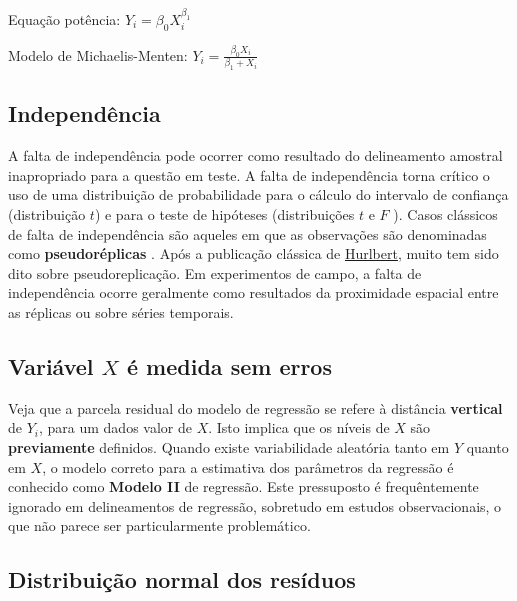 \documentclass[
]{book}
\begin{document}
Equação potência: \(Y_i = \beta_0 X_i^{\beta_1}\)

Modelo de Michaelis-Menten: \(Y_i = \frac{\beta_0 X_i}{\beta_1 + X_i}\)

\hypertarget{independuxeancia}{%
\subsection{Independência}\label{independuxeancia}}

A falta de independência pode ocorrer como resultado do delineamento amostral inapropriado para a questão em teste. A falta de independência torna crítico o uso de uma distribuição de probabilidade para o cálculo do intervalo de confiança (distribuição \(t\)) e para o teste de hipóteses (distribuições \(t\) e \(F\) ). Casos clássicos de falta de independência são aqueles em que as observações são denominadas como \textbf{pseudoréplicas} \citep{hurlbert1984pseudoreplication}. Após a publicação clássica de \href{https://esajournals.onlinelibrary.wiley.com/doi/abs/10.2307/1942661}{Hurlbert}, muito tem sido dito sobre pseudoreplicação. Em experimentos de campo, a falta de independência ocorre geralmente como resultados da proximidade espacial entre as réplicas ou sobre séries temporais.

\hypertarget{variuxe1vel-x-uxe9-medida-sem-erros}{%
\subsection{\texorpdfstring{Variável \(X\) é medida sem erros}{Variável X é medida sem erros}}\label{variuxe1vel-x-uxe9-medida-sem-erros}}

Veja que a parcela residual do modelo de regressão se refere à distância \textbf{vertical} de \(Y_i\), para um dados valor de \(X\). Isto implica que os níveis de \(X\) são \textbf{previamente} definidos. Quando existe variabilidade aleatória tanto em \(Y\) quanto em \(X\), o modelo correto para a estimativa dos parâmetros da regressão é conhecido como \textbf{Modelo II} de regressão. Este pressuposto é frequêntemente ignorado em delineamentos de regressão, sobretudo em estudos observacionais, o que não parece ser particularmente problemático.

\hypertarget{distribuiuxe7uxe3o-normal-dos-resuxedduos}{%
\subsection{Distribuição normal dos resíduos}\label{distribuiuxe7uxe3o-normal-dos-resuxedduos}}
\end{document}
